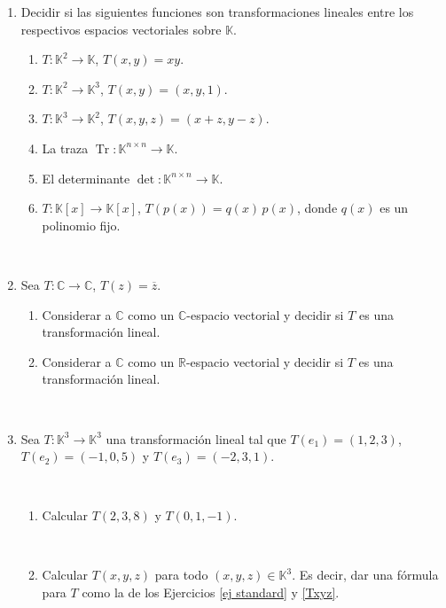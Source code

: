 \documentclass[12pt]{amsart}
\begin{document}
\begin{enumerate}[resume, topsep=5pt,itemsep=5pt]
\item Decidir si las siguientes funciones son transformaciones lineales entre los respectivos espacios vectoriales sobre $\mathbb{K}$.
\begin{enumerate}[resume, topsep=5pt,itemsep=5pt]
 \item $T:\mathbb{K}^2\longrightarrow\mathbb{K}$, $T(x,y)=xy$.
 \item $T:\mathbb{K}^2\longrightarrow\mathbb{K}^3$, $T(x,y)=(x,y,1)$.
 \item\label{ej standard} $T:\mathbb{K}^3\longrightarrow\mathbb{K}^2$, $T(x,y,z)=(x+z,y-z)$.
 \item La traza $\operatorname{Tr}:\mathbb{K}^{n\times n}\longrightarrow\mathbb{K}$.
 \item El determinante $\operatorname{det}:\mathbb{K}^{n\times n}\longrightarrow\mathbb{K}$.
 \item $T:\mathbb{K}[x]\longrightarrow\mathbb{K}[x]$, $T(p(x))=q(x)\,p(x)$, donde $q(x)$ es un polinomio fijo.
\end{enumerate}

\

\item Sea $T:\mathbb{C}\longrightarrow\mathbb{C}$, $T(z)=\overline{z}$.
\begin{enumerate}
 \item Considerar a $\mathbb{C}$ como un $\mathbb{C}$-espacio vectorial y decidir si $T$ es una transformaci\'on lineal.
 \item Considerar a $\mathbb{C}$ como un $\mathbb{R}$-espacio vectorial y decidir si $T$ es una transformaci\'on lineal.
\end{enumerate}

\
	
\item\label{T en la base} Sea $T:\mathbb{K}^3\longrightarrow\mathbb{K}^3$ una transformaci\'on lineal tal que $T(e_1)=(1,2,3)$, $T(e_2)=(-1,0,5)$ y $T(e_3)=(-2,3,1)$.

\

\begin{enumerate}
\item Calcular $T(2,3,8)$ y $T(0,1,-1)$.

\

\item\label{T en la base b} Calcular $T(x,y,z)$ para todo $(x,y,z)\in\mathbb{K}^3$. Es decir, dar una f\'ormula para $T$ como la de los Ejercicios \eqref{ej standard} y \eqref{Txyz}.



\end{enumerate}
\end{enumerate}
\end{document}
